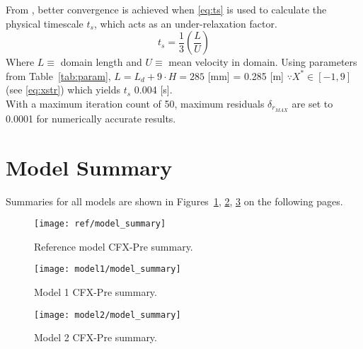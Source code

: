 From \cite{tut}, better convergence is achieved when \ref{eq:ts} is used to calculate the physical timescale $t_s$, which acts as an under-relaxation factor. 
\begin{equation}
	\label{eq:ts}
	t_s = \frac{1}{3} \left( \frac{L}{U} \right)
\end{equation}
Where $L\equiv$ domain length and $U\equiv$ mean velocity in domain. Using parameters from Table~\ref{tab:param}, $L = L_d + 9\cdot H = 285$ [mm] = 0.285 [m] $\because X^*\in [-1,9]$ (see \ref{eq:xstr}) which yields $t_s$ 0.004 [s].\\  

With a maximum iteration count of 50, maximum residuals $\delta_{r_{MAX}}$ are set to 0.0001 for numerically accurate results.

\section{Model Summary}
\label{sec:pre_summary}

Summaries for all models are shown in Figures~\ref{fig:ref_modsum}, \ref{fig:mod1_modsum},  \ref{fig:mod2_modsum} on the following pages.

\begin{figure}[H]
	\centering
	\texttt{[image: ref/model\_summary]}
	\caption{Reference model CFX-Pre summary.}
	\label{fig:ref_modsum}
\end{figure}
\begin{figure}[H]
	\centering
	\texttt{[image: model1/model\_summary]}
	\caption{Model 1 CFX-Pre summary.}
	\label{fig:mod1_modsum}
\end{figure}
\begin{figure}[H]
	\centering
	\texttt{[image: model2/model\_summary]}
	\caption{Model 2 CFX-Pre summary.}
	\label{fig:mod2_modsum}
\end{figure}